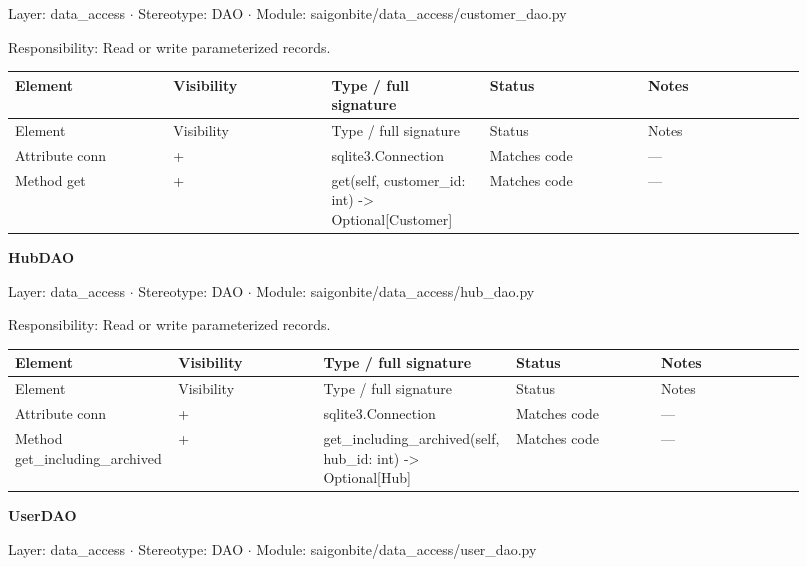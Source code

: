 Layer: data\_access \ensuremath{\cdot} Stereotype: \guillemotleft{}DAO\guillemotright{} \ensuremath{\cdot} Module: saigonbite/data\_access/customer\_dao.py

Responsibility: Read or write parameterized records.

\begin{longtable}{>{\raggedright\arraybackslash}p{0.1840\linewidth}>{\raggedright\arraybackslash}p{0.1840\linewidth}>{\raggedright\arraybackslash}p{0.1840\linewidth}>{\raggedright\arraybackslash}p{0.1840\linewidth}>{\raggedright\arraybackslash}p{0.1840\linewidth}}
Element & Visibility & Type / full signature & Status & Notes \\
\hline\endfirsthead
Element & Visibility & Type / full signature & Status & Notes \\
\hline\endhead
Attribute conn & + & sqlite3.Connection & Matches code & --- \\
Method get & + & get(self, customer\_id: int) -\textgreater{} Optional[Customer] & Matches code & --- \\
\end{longtable}
\textbf{HubDAO}

Layer: data\_access \ensuremath{\cdot} Stereotype: \guillemotleft{}DAO\guillemotright{} \ensuremath{\cdot} Module: saigonbite/data\_access/hub\_dao.py

Responsibility: Read or write parameterized records.

\begin{longtable}{>{\raggedright\arraybackslash}p{0.1840\linewidth}>{\raggedright\arraybackslash}p{0.1840\linewidth}>{\raggedright\arraybackslash}p{0.1840\linewidth}>{\raggedright\arraybackslash}p{0.1840\linewidth}>{\raggedright\arraybackslash}p{0.1840\linewidth}}
Element & Visibility & Type / full signature & Status & Notes \\
\hline\endfirsthead
Element & Visibility & Type / full signature & Status & Notes \\
\hline\endhead
Attribute conn & + & sqlite3.Connection & Matches code & --- \\
Method get\_including\_archived & + & get\_including\_archived(self, hub\_id: int) -\textgreater{} Optional[Hub] & Matches code & --- \\
\end{longtable}
\textbf{UserDAO}

Layer: data\_access \ensuremath{\cdot} Stereotype: \guillemotleft{}DAO\guillemotright{} \ensuremath{\cdot} Module: saigonbite/data\_access/user\_dao.py

